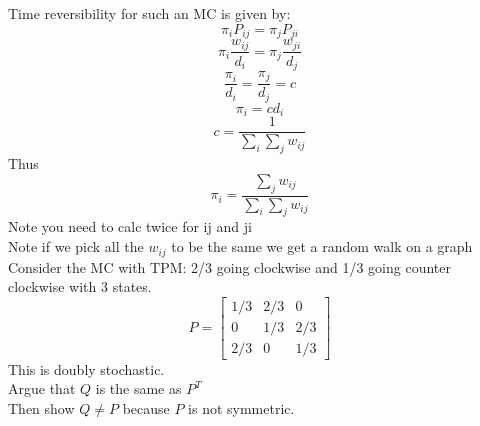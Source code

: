 \documentclass{article}
\begin{document}
Time reversibility for such an MC is given by:
$$\pi_i P_{ij} = \pi_j P_{ji}$$
$$\pi_i \frac{w_{ij}}{d_i} = \pi_j \frac{w_{ji}}{d_j}$$
$$\frac{\pi_i}{d_i} = \frac{\pi_j}{d_j} = c$$
$$ \pi_i = c d_i$$
$$ c = \frac{1}{\sum_i \sum_j w_{ij}}$$
Thus 
$$\pi_i = \frac{\sum_{j}w_{ij}}{\sum_i \sum_j w_{ij}}$$
Note you need to calc twice for ij and ji\\
Note if we pick all the $w_{ij} $ to be the same we get a random walk on a graph\\
Consider the MC with TPM:
2/3 going clockwise and 1/3 going counter clockwise with 3 states.\\
$$P = \begin{bmatrix}
    1/3 & 2/3 & 0 \\
    0 & 1/3 & 2/3 \\
    2/3 & 0 & 1/3
\end{bmatrix}$$
This is doubly stochastic.\\
Argue that $Q$ is the same as $P^T$\\
Then show $Q \neq P$ because $P$ is not symmetric.\\
\end{document}
